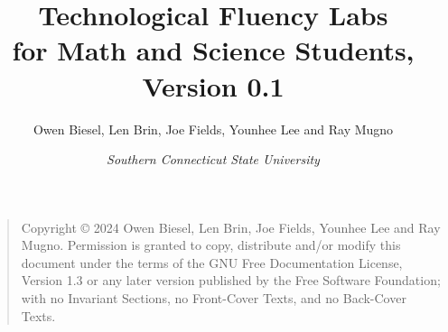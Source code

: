 \documentclass[pdftex,12pt,twoside]{book}
\begin{document}
\frontmatter

\title{Technological Fluency Labs \\ for Math and Science Students, \\ Version 0.1}
\author{Owen Biesel, Len Brin, Joe Fields, Younhee Lee and Ray Mugno}
\date{\em Southern Connecticut State University}

\maketitle

\clearpage

\rule{0pt}{0pt}

\vfill

\begin{quote}
    Copyright \copyright{}  2024 Owen Biesel,  Len Brin, Joe Fields, Younhee Lee and Ray Mugno.
    Permission is granted to copy, distribute and/or modify this document
    under the terms of the GNU Free Documentation License, Version 1.3
    or any later version published by the Free Software Foundation;
    with no Invariant Sections, no Front-Cover Texts, and no Back-Cover Texts.
\end{quote}

\vfill


\clearpage







\tableofcontents





\mainmatter









\nocite{texbook}
\nocite{latex}
\nocite{strunk-and-white}

{}%



{}
\printindex
\end{document}
